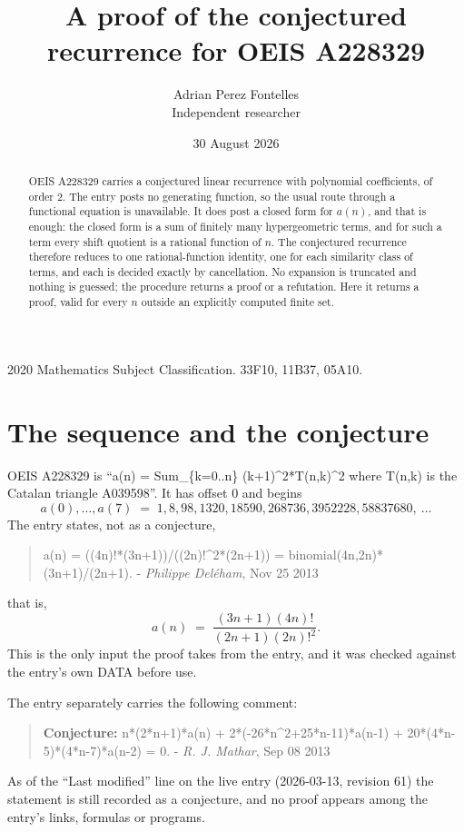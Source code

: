 \documentclass[11pt,a4paper]{article}
\title{A proof of the conjectured recurrence for OEIS A228329}
\author{Adrian Perez Fontelles\\ \small Independent researcher}
\date{30 August 2026}
\theoremstyle{plain}
\theoremstyle{definition}
\begin{document}
\maketitle

\begin{abstract}
OEIS A228329 carries a conjectured linear recurrence with polynomial coefficients, of
order 2. The entry posts no generating function, so the usual route through a
functional equation is unavailable. It does post a closed form for $a(n)$, and that is
enough: the closed form is a sum of finitely many hypergeometric terms, and for such a
term every shift quotient is a rational function of $n$. The conjectured recurrence
therefore reduces to one rational-function identity, one for each similarity
class of terms, and each is decided exactly by cancellation. No expansion is truncated and
nothing is guessed; the procedure returns a proof or a refutation. Here it returns a proof,
valid for every $n$ outside an explicitly computed finite set.
\end{abstract}

\noindent\small 2020 Mathematics Subject Classification. 33F10, 11B37, 05A10.\normalsize

\section{The sequence and the conjecture}

OEIS A228329 is ``a(n) = Sum\_\{k=0..n\} (k+1)\^{}2*T(n,k)\^{}2 where T(n,k) is the Catalan triangle A039598''. It has offset $0$ and begins
\[
a(0),\dots,a(7)\;=\;1, 8, 98, 1320, 18590, 268736, 3952228, 58837680,\ \dots
\]
The entry states, not as a conjecture,
\begin{quote}\small
a(n) = ((4n)!*(3n+1))/((2n)!\^{}2*(2n+1)) = binomial(4n,2n)*(3n+1)/(2n+1). - \emph{Philippe Deléham}, Nov 25 2013
\end{quote}
that is,
\begin{equation}\label{eq:cf}
a(n)\;=\;\frac{\left(3 n + 1\right) \left(4 n\right)!}{\left(2 n + 1\right) \left(2 n\right)!^{2}} .
\end{equation}
This is the only input the proof takes from the entry, and it was checked against the
entry's own DATA before use.

The entry separately carries the following comment:
\begin{quote}\small
\textbf{Conjecture:} n*(2*n+1)*a(n) + 2*(-26*n\^{}2+25*n-11)*a(n-1) + 20*(4*n-5)*(4*n-7)*a(n-2) = 0. - \emph{R. J. Mathar}, Sep 08 2013
\end{quote}
As of the ``Last modified'' line on the live entry (2026-03-13, revision 61) the
statement is still recorded as a conjecture, and no proof appears among the entry's links,
formulas or programs.
\end{document}
